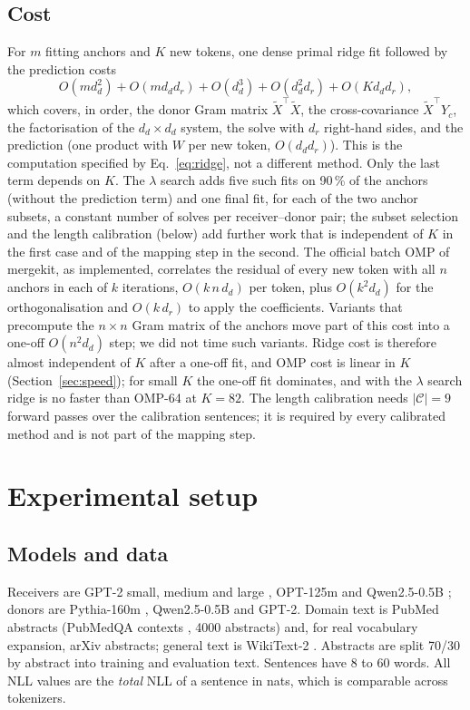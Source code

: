 \documentclass[preprint,12pt]{elsarticle}
\begin{document}
\subsection{Cost}
For $m$ fitting anchors and $K$ new tokens, one dense primal ridge fit followed by the prediction costs
\begin{equation}
O(m d_d^2) + O(m d_d d_r) + O(d_d^3) + O(d_d^2 d_r) + O(K d_d d_r),
\end{equation}
which covers, in order, the donor Gram matrix $\tilde X^\top\tilde X$, the cross-covariance $\tilde X^\top Y_c$, the factorisation of the $d_d\times d_d$ system, the solve with $d_r$ right-hand sides, and the prediction (one product with $W$ per new token, $O(d_d d_r)$). This is the computation specified by Eq.~\eqref{eq:ridge}, not a different method. Only the last term depends on $K$. The $\lambda$ search adds five such fits on 90\,\% of the anchors (without the prediction term) and one final fit, for each of the two anchor subsets, a constant number of solves per receiver--donor pair; the subset selection and the length calibration (below) add further work that is independent of $K$ in the first case and of the mapping step in the second. The official batch OMP of mergekit, as implemented, correlates the residual of every new token with all $n$ anchors in each of $k$ iterations, $O(k\,n\,d_d)$ per token, plus $O(k^2 d_d)$ for the orthogonalisation and $O(k\,d_r)$ to apply the coefficients. Variants that precompute the $n\times n$ Gram matrix of the anchors move part of this cost into a one-off $O(n^2 d_d)$ step; we did not time such variants. Ridge cost is therefore almost independent of $K$ after a one-off fit, and OMP cost is linear in $K$ (Section~\ref{sec:speed}); for small $K$ the one-off fit dominates, and with the $\lambda$ search ridge is no faster than OMP-64 at $K=82$. The length calibration needs $|\mathcal C|=9$ forward passes over the calibration sentences; it is required by every calibrated method and is not part of the mapping step.

\section{Experimental setup}
\label{sec:setup}
\subsection{Models and data}
Receivers are GPT-2 small, medium and large \cite{radford2019gpt2}, OPT-125m \cite{zhang2022opt} and Qwen2.5-0.5B \cite{qwen2024qwen25}; donors are Pythia-160m \cite{biderman2023pythia}, Qwen2.5-0.5B and GPT-2. Domain text is PubMed abstracts (PubMedQA contexts \cite{jin2019pubmedqa}, 4000 abstracts) and, for real vocabulary expansion, arXiv abstracts; general text is WikiText-2 \cite{merity2016wikitext}. Abstracts are split 70/30 by abstract into training and evaluation text. Sentences have 8 to 60 words. All NLL values are the \emph{total} NLL of a sentence in nats, which is comparable across tokenizers.
\end{document}
